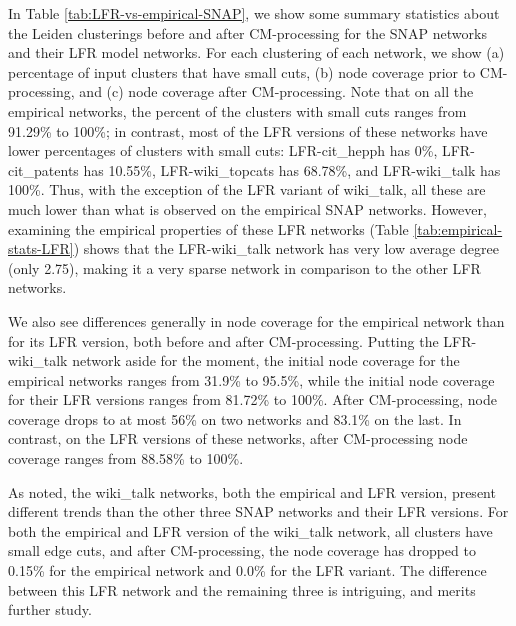 \documentclass[11pt]{article}   	%
\begin{document}
In Table \ref{tab:LFR-vs-empirical-SNAP}, we show some summary statistics about the  Leiden clusterings before and after CM-processing for the SNAP networks and their LFR model networks.  For each clustering of each network, we  show (a) percentage of input clusters that have small cuts, (b) node coverage prior to CM-processing, and (c) node coverage after CM-processing.  
Note that on all the empirical networks, the percent of the clusters with small cuts ranges from 91.29\% to 100\%; in contrast, most of the LFR versions of these
networks have lower percentages of clusters with small cuts: 
LFR-cit\_hepph has 0\%, 
LFR-cit\_patents has 10.55\%, 
LFR-wiki\_topcats has 68.78\%, and 
LFR-wiki\_talk has 100\%.  
Thus, with the exception of the LFR variant of wiki\_talk, all these are much lower than what is observed on the empirical SNAP networks.
However, examining the empirical properties of these LFR networks (Table \ref{tab:empirical-stats-LFR}) shows that the LFR-wiki\_talk network has very 
low average degree (only 2.75), making it a very sparse network in comparison to the other LFR networks.

We also see differences generally in node coverage   for the empirical network than for its
LFR version, both before and after CM-processing. 
Putting the LFR-wiki\_talk network aside for the moment, the initial node coverage for the empirical networks ranges from 31.9\% to 95.5\%,
while the initial node coverage for their LFR versions ranges from 81.72\% to 100\%. 
After CM-processing,   node coverage drops to at most 56\% on two networks and 83.1\% on the last.
In contrast, on the LFR versions of these networks, after CM-processing node coverage  ranges from 88.58\% to 100\%.

As noted, the wiki\_talk networks, both the empirical and LFR version, present different trends than the other three SNAP networks and their LFR versions. 
For both the empirical and LFR version of the wiki\_talk network, all clusters have small edge cuts, and after CM-processing, the node coverage has dropped to 0.15\% for the
empirical network and 0.0\% for the LFR variant. 
The difference between this LFR network and the remaining three is intriguing, and merits further study.



\end{document}
